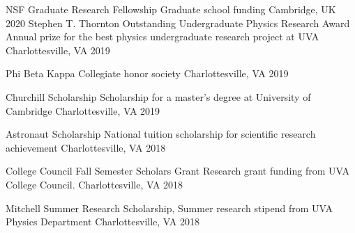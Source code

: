 



\begin{cvhonors}
  \cvhonor
    {NSF Graduate Research Fellowship} %
    {Graduate school funding} %
    {Cambridge, UK} %
    {2020} %
  \cvhonor
    {Stephen T. Thornton Outstanding Undergraduate Physics Research Award} %
    {Annual prize for the best physics undergraduate research project at UVA} %
    {Charlottesville, VA} %
    {2019} %

  \cvhonor
    {Phi Beta Kappa} %
    {Collegiate honor society} %
    {Charlottesville, VA} %
    {2019} %

  \cvhonor
    {Churchill Scholarship} %
    {Scholarship for a master’s degree at University of Cambridge} %
    {Charlottesville, VA} %
    {2019} %
    
  \cvhonor
    {Astronaut Scholarship} %
    {National tuition scholarship for scientific research achievement} %
    {Charlottesville, VA} %
    {2018} %
    
  \cvhonor
    {College Council Fall Semester Scholars Grant} %
    {Research grant funding from UVA College Council.} %
    {Charlottesville, VA} %
    {2018} %
    
  \cvhonor
    {Mitchell Summer Research Scholarship,} %
    {Summer research stipend from UVA Physics Department} %
    {Charlottesville, VA} %
    {2018} %
    

\end{cvhonors}
